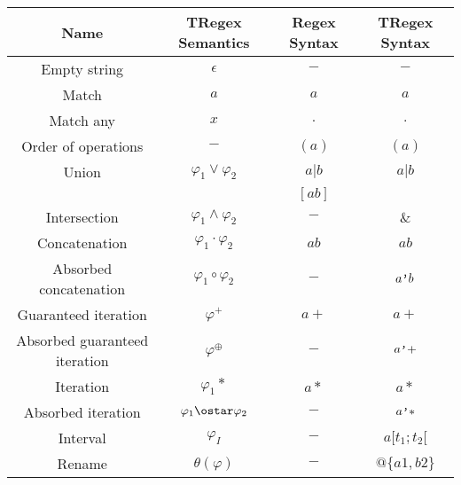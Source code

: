 \begin{tabular}{ |c|c|c|c| }
    \hline
    \textbf{Name} & \textbf{TRegex Semantics} & \textbf{Regex Syntax} & \textbf{TRegex Syntax} \\
    \hline
    Empty string & $\epsilon$ & $-$ & $-$ \\
    \hline
    Match & $a$ & $a$ & $a$ \\
    \hline
    Match any & $x$ & $.$ & $.$ \\
    \hline
    Order of operations & $-$ & $(a)$ & $(a)$ \\
    \hline
    Union & $\varphi_1\vee\varphi_2$ & $a|b$ & $a|b$ \\
    & & $[ab]$ &  \\
    \hline
    Intersection & $\varphi_1\wedge\varphi_2$ & $-$ & $\&$ \\
    \hline
    Concatenation & $\varphi_1\cdot\varphi_2$ & $ab$ & $ab$ \\
    \hline
    Absorbed concatenation & $\varphi_1\circ\varphi_2$ & $-$ & $a\verb|'|b$ \\
    \hline
    Guaranteed iteration & $\varphi^+$ & $a+$ & $a+$ \\
    \hline
    Absorbed guaranteed iteration & $\varphi^\oplus$ & $-$ & $a\verb|'|+$ \\
    \hline
    Iteration & $\varphi_1*$ & $a*$ & $a*$ \\
    \hline
    Absorbed iteration & $\varphi_1\ostar\varphi_2$ & $-$ & $a\verb|'|*$ \\
    \hline
    Interval & $\varphi_I$ & $-$ & $a[t_1;t_2[$ \\
    \hline
    Rename & $\theta(\varphi)$ & $-$ & $@\{a1,b2\}$ \\
    \hline
\end{tabular}